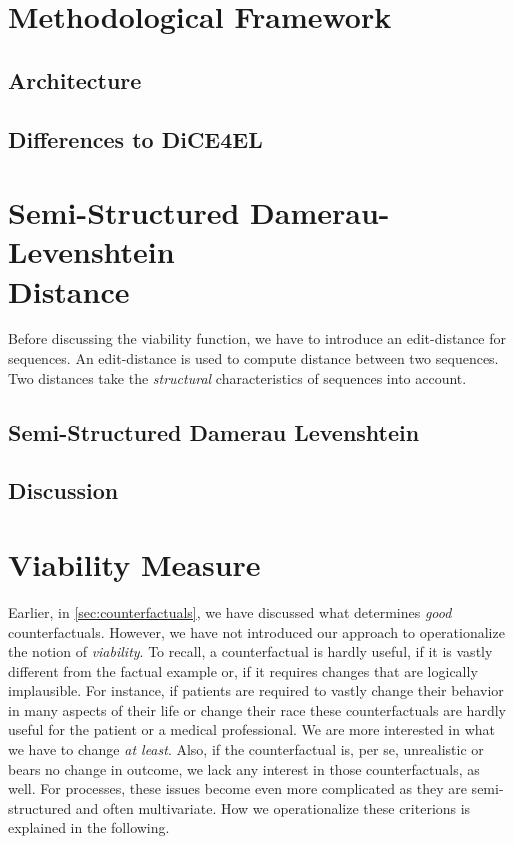 \documentclass[12pt,a4paper]{report}
\begin{document}
\section{Methodological Framework}
\label{sec:framework}
\subsection{Architecture}


\subsection{Differences to DiCE4EL}


\section{Semi-Structured Damerau-Levenshtein \\ Distance}
\label{sec:ssdld}
Before discussing the viability function, we have to introduce an edit-distance for sequences. An edit-distance is used to compute distance between two sequences. Two distances take the \emph{structural} characteristics of sequences into account. 

\subsection{Semi-Structured Damerau Levenshtein}


\subsection{Discussion}


\section{Viability Measure}
\label{sec:viability}
Earlier, in \autoref{sec:counterfactuals}, we have discussed what determines \emph{good} counterfactuals. However, we have not introduced our approach to operationalize the notion of \emph{viability}. To recall, a counterfactual is hardly useful, if it is vastly different from the factual example or, if it requires changes that are logically implausible. For instance, if patients are required to vastly change their behavior in many aspects of their life or change their race these counterfactuals are hardly useful for the patient or a medical professional. We are more interested in what we have to change \emph{at least}. Also, if the counterfactual is, per se, unrealistic or bears no change in outcome, we lack any interest in those counterfactuals, as well. For processes, these issues become even more complicated as they are semi-structured and often multivariate. How we operationalize these criterions is explained in the following.
\end{document}
